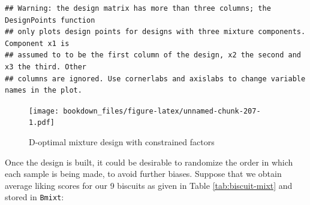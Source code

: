 \documentclass[
]{krantz}
\makeatletter
\newenvironment{Shaded}{\begin{snugshade}}{\end{snugshade}}
\newcommand{\AttributeTok}[1]{\textcolor[rgb]{0.61,0.61,0.61}{#1}}
\newcommand{\ConstantTok}[1]{\textcolor[rgb]{0,0,0}{#1}}
\newcommand{\DecValTok}[1]{\textcolor[rgb]{0.06,0.06,0.06}{#1}}
\newcommand{\FunctionTok}[1]{\textcolor[rgb]{0,0,0}{#1}}
\newcommand{\NormalTok}[1]{#1}
\newcommand{\OtherTok}[1]{\textcolor[rgb]{0.37,0.37,0.37}{#1}}
\newcommand{\SpecialCharTok}[1]{\textcolor[rgb]{0,0,0}{#1}}
\newcommand{\StringTok}[1]{\textcolor[rgb]{0.5,0.5,0.5}{#1}}
\newenvironment{kframe}{%
\medskip{}
\setlength{\fboxsep}{.8em}
 \def\at@end@of@kframe{}%
 \ifinner\ifhmode%
  \def\at@end@of@kframe{\end{minipage}}%
  \begin{minipage}{\columnwidth}%
 \fi\fi%
 \def\FrameCommand##1{\hskip\@totalleftmargin \hskip-\fboxsep
 \colorbox{shadecolor}{##1}\hskip-\fboxsep
     \hskip-\linewidth \hskip-\@totalleftmargin \hskip\columnwidth}%
 \MakeFramed {\advance\hsize-\width
   \@totalleftmargin\z@ \linewidth\hsize
   \@setminipage}}%
 {\par\unskip\endMakeFramed%
 \at@end@of@kframe}
\renewenvironment{Shaded}{\begin{kframe}}{\end{kframe}}
\makeatother
\begin{document}
\begin{Shaded}
\end{Shaded}

\begin{verbatim}
## Warning: the design matrix has more than three columns; the DesignPoints function  
## only plots design points for designs with three mixture components. Component x1 is 
## assumed to to be the first column of the design, x2 the second and x3 the third. Other 
## columns are ignored. Use cornerlabs and axislabs to change variable names in the plot.
\end{verbatim}

\begin{figure}
\centering
\texttt{[image: bookdown\_files/figure-latex/unnamed-chunk-207-1.pdf]}
\caption{\label{fig:unnamed-chunk-207}D-optimal mixture design with constrained factors}
\end{figure}

Once the design is built, it could be desirable to randomize the order in which each sample is being made, to avoid further biases. Suppose that we obtain average liking scores for our 9 biscuits as given in Table \ref{tab:biscuit-mixt} and stored in \texttt{Bmixt}:
\end{document}
